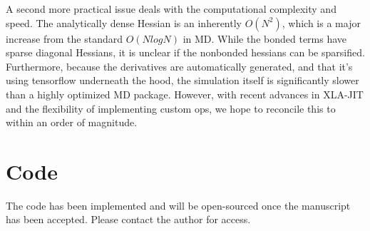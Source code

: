 \documentclass{article}
\begin{document}
A second more practical issue deals with the computational complexity and speed. The analytically dense Hessian is an inherently $O(N^2)$, which is a major increase from the standard $O(N log N)$ in MD. While the bonded terms have sparse diagonal Hessians, it is unclear if the nonbonded hessians can be sparsified. Furthermore, because the derivatives are automatically generated, and that it's using tensorflow underneath the hood, the simulation itself is significantly slower than a highly optimized MD package. However, with recent advances in XLA-JIT and the flexibility of implementing custom ops, we hope to reconcile this to within an order of magnitude.

\section{Code}

The code has been implemented and will be open-sourced once the manuscript has been accepted. Please contact the author for access.
\end{document}
